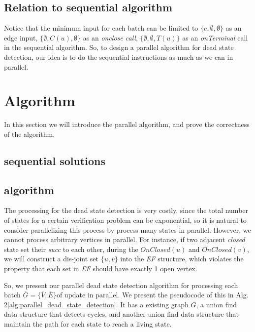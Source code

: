 \subsection{Relation to sequential algorithm}

Notice that the minimum input for each batch can be limited to $\{e,\emptyset,\emptyset\}$ as an edge input, $\{\emptyset, {C(u)}, \emptyset\}$ as an \textsl{onclose call}, $\{\emptyset, \emptyset, {T(u)}\}$ as an \textsl{onTerminal} call in the sequential algorithm. So, to design a parallel algorithm for dead state detection, our idea is to do the sequential instructions as much as we can in parallel.

\section{Algorithm}

In this section we will introduce the parallel algorithm, and prove the correctness of the algorithm.
\subsection{sequential solutions}

\subsection{algorithm}

The processing for the dead state detection is very costly, since the total number of states for a certain verification problem can be exponential, so it is natural to consider parallelizing this process by process many states in parallel. However, we cannot process arbitrary vertices in parallel. For instance, if two adjacent \textsl{closed} state set their \textsl{succ} to each other, during the $OnClosed(u)$ and $OnClosed(v)$, we will construct a dis-joint set $\{u,v\}$ into the \textsl{EF} structure, which violates the property that each set in \textsl{EF} should have exactly 1 open vertex.

So, we present our parallel dead state detection algorithm for processing each batch $\overline G=\{\overline V, \overline E\}$of update in parallel. We present the pseudocode of this in Alg. 2\ref{alg:parallel_dead_state_detection}. It has a existing graph $G$, a union find data structure that detects cycles, and another union find data structure that maintain the path for each state to reach a living state. 


